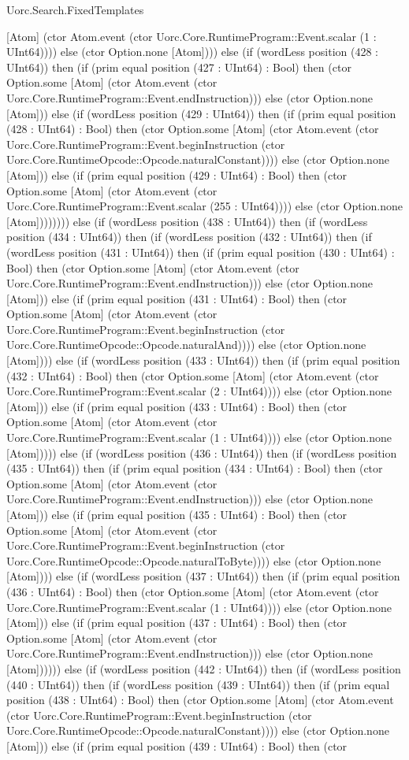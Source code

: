 \begin{lexlean}{Uorc.Search.FixedTemplates}
\begin{semanticmodule}
{[Atom] (ctor Atom.event (ctor Uorc.Core.RuntimeProgram::Event.scalar (1 : UInt64)))) else (ctor Option.none [Atom]))) else (if (wordLess position (428 : UInt64)) then (if (prim equal position (427 : UInt64) : Bool) then (ctor Option.some [Atom] (ctor Atom.event (ctor Uorc.Core.RuntimeProgram::Event.endInstruction))) else (ctor Option.none [Atom])) else (if (wordLess position (429 : UInt64)) then (if (prim equal position (428 : UInt64) : Bool) then (ctor Option.some [Atom] (ctor Atom.event (ctor Uorc.Core.RuntimeProgram::Event.beginInstruction (ctor Uorc.Core.RuntimeOpcode::Opcode.naturalConstant)))) else (ctor Option.none [Atom])) else (if (prim equal position (429 : UInt64) : Bool) then (ctor Option.some [Atom] (ctor Atom.event (ctor Uorc.Core.RuntimeProgram::Event.scalar (255 : UInt64)))) else (ctor Option.none [Atom]))))))) else (if (wordLess position (438 : UInt64)) then (if (wordLess position (434 : UInt64)) then (if (wordLess position (432 : UInt64)) then (if (wordLess position (431 : UInt64)) then (if (prim equal position (430 : UInt64) : Bool) then (ctor Option.some [Atom] (ctor Atom.event (ctor Uorc.Core.RuntimeProgram::Event.endInstruction))) else (ctor Option.none [Atom])) else (if (prim equal position (431 : UInt64) : Bool) then (ctor Option.some [Atom] (ctor Atom.event (ctor Uorc.Core.RuntimeProgram::Event.beginInstruction (ctor Uorc.Core.RuntimeOpcode::Opcode.naturalAnd)))) else (ctor Option.none [Atom]))) else (if (wordLess position (433 : UInt64)) then (if (prim equal position (432 : UInt64) : Bool) then (ctor Option.some [Atom] (ctor Atom.event (ctor Uorc.Core.RuntimeProgram::Event.scalar (2 : UInt64)))) else (ctor Option.none [Atom])) else (if (prim equal position (433 : UInt64) : Bool) then (ctor Option.some [Atom] (ctor Atom.event (ctor Uorc.Core.RuntimeProgram::Event.scalar (1 : UInt64)))) else (ctor Option.none [Atom])))) else (if (wordLess position (436 : UInt64)) then (if (wordLess position (435 : UInt64)) then (if (prim equal position (434 : UInt64) : Bool) then (ctor Option.some [Atom] (ctor Atom.event (ctor Uorc.Core.RuntimeProgram::Event.endInstruction))) else (ctor Option.none [Atom])) else (if (prim equal position (435 : UInt64) : Bool) then (ctor Option.some [Atom] (ctor Atom.event (ctor Uorc.Core.RuntimeProgram::Event.beginInstruction (ctor Uorc.Core.RuntimeOpcode::Opcode.naturalToByte)))) else (ctor Option.none [Atom]))) else (if (wordLess position (437 : UInt64)) then (if (prim equal position (436 : UInt64) : Bool) then (ctor Option.some [Atom] (ctor Atom.event (ctor Uorc.Core.RuntimeProgram::Event.scalar (1 : UInt64)))) else (ctor Option.none [Atom])) else (if (prim equal position (437 : UInt64) : Bool) then (ctor Option.some [Atom] (ctor Atom.event (ctor Uorc.Core.RuntimeProgram::Event.endInstruction))) else (ctor Option.none [Atom]))))) else (if (wordLess position (442 : UInt64)) then (if (wordLess position (440 : UInt64)) then (if (wordLess position (439 : UInt64)) then (if (prim equal position (438 : UInt64) : Bool) then (ctor Option.some [Atom] (ctor Atom.event (ctor Uorc.Core.RuntimeProgram::Event.beginInstruction (ctor Uorc.Core.RuntimeOpcode::Opcode.naturalConstant)))) else (ctor Option.none [Atom])) else (if (prim equal position (439 : UInt64) : Bool) then (ctor }
\end{semanticmodule}
\end{lexlean}
